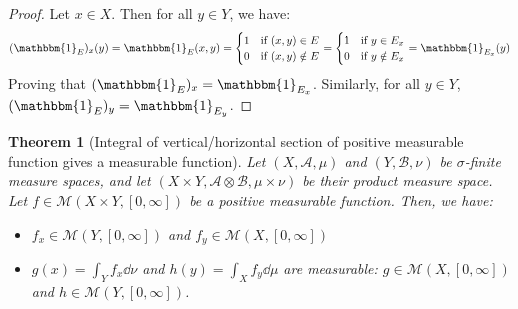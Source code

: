 \documentclass{article}
\newtheorem{theorem}{Theorem}[section]
\theoremstyle{definition}
\theoremstyle{remark}
\theoremstyle{example}
\theoremstyle{notation}
\theoremstyle{axiom}
\newcommand{\tif}{\text{if }}
\begin{document}
\begin{proof}
		Let $x \in X$. Then for all $y \in Y$, we have:
				$$(\mathbbm{1}_E)_x(y) = \mathbbm{1}_{E}(x, y) = \begin{cases}1 & \tif (x, y) \in E\\0 & \tif (x, y) \notin E\end{cases} = \begin{cases}1 & \tif y \in E_x\\0 & \tif y \notin E_x\end{cases} = \mathbbm{1}_{E_x}(y)$$
		Proving that $(\mathbbm{1}_E)_x = \mathbbm{1}_{E_x}$. Similarly, for all $y \in Y$, $(\mathbbm{1}_E)_y = \mathbbm{1}_{E_y}$.
\end{proof}

\begin{theorem}[Integral of vertical/horizontal section of positive measurable function gives a measurable function] %
		Let $(X, \mathcal{A}, \mu)$ and $(Y, \mathcal{B}, \nu)$ be $\sigma$-finite measure spaces, and let $(X \times Y, \mathcal{A} \otimes \mathcal{B}, \mu \times \nu)$ be their product measure space. Let $f \in \mathcal{M}(X \times Y, [0, \infty])$ be a positive measurable function. Then, we have:
		\begin{itemize}
				\item $f_x \in \mathcal{M}(Y, [0, \infty])$ and $f_y \in \mathcal{M}(X, [0, \infty])$
				\item $g(x) = \int_Y f_x \dd \nu$ and $h(y) = \int_X f_y \dd \mu$ are measurable: $g \in \mathcal{M}(X, [0, \infty])$ and $h \in \mathcal{M}(Y, [0, \infty])$.%
		\end{itemize}
\end{theorem}
\end{document}
